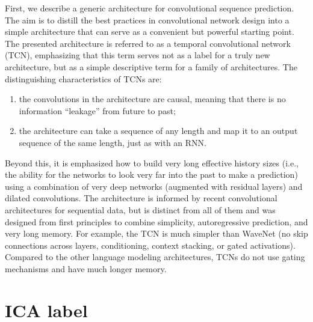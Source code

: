 \documentclass[12pt,a4paper,titlepage,openany]{report}
\begin{document}
First, we describe a generic architecture for convolutional sequence prediction. 
The aim is to distill the best practices in convolutional network design into a simple architecture that can serve as a convenient but powerful starting point. 
The presented architecture is referred to as a temporal convolutional network (TCN), emphasizing that this term serves not as a label for a truly new architecture, but as a simple descriptive term for a family of architectures. 
The distinguishing characteristics of TCNs are: 
\begin{enumerate}
     \item the convolutions in the architecture are causal, meaning that there is no information “leakage” from future to past; 
     \item the architecture can take a sequence of any length and map it to an output sequence of the same length, just as with an RNN. 
\end{enumerate}   
Beyond this, it is emphasized how to build very long effective history sizes (i.e., the ability for the networks to look very far into the past to make a prediction) using a combination of very deep networks (augmented with residual layers) and dilated convolutions. The architecture is informed by recent convolutional architectures for sequential data, but is distinct from all of them and was designed from first principles to combine simplicity, autoregressive prediction, and very long memory. For example, the TCN is much simpler than WaveNet (no skip connections across layers, conditioning, context stacking, or gated activations). 
Compared to the other language modeling architectures, TCNs do not use gating mechanisms and have much longer memory.\cite{bai2018}

\section{ICA label}
\end{document}
